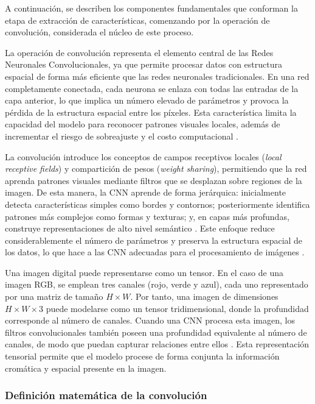 	A continuación, se describen los componentes fundamentales que conforman la etapa de extracción de características, comenzando por la operación de convolución, considerada el núcleo de este proceso.
	
	La operación de convolución representa el elemento central de las Redes Neuronales Convolucionales, ya que permite procesar datos con estructura espacial de forma más eficiente que las redes neuronales tradicionales. En una red completamente conectada, cada neurona se enlaza con todas las entradas de la capa anterior, lo que implica un número elevado de parámetros y provoca la pérdida de la estructura espacial entre los píxeles. Esta característica limita la capacidad del modelo para reconocer patrones visuales locales, además de incrementar el riesgo de sobreajuste y el costo computacional \cite{goodfellow2016dl}.
	
	La convolución introduce los conceptos de campos receptivos locales (\textit{local receptive fields}) y compartición de pesos (\textit{weight sharing}), permitiendo que la red aprenda patrones visuales mediante filtros que se desplazan sobre regiones de la imagen. De esta manera, la CNN aprende de forma jerárquica: inicialmente detecta características simples como bordes y contornos; posteriormente identifica patrones más complejos como formas y texturas; y, en capas más profundas, construye representaciones de alto nivel semántico \cite{oshea2015}. Este enfoque reduce considerablemente el número de parámetros y preserva la estructura espacial de los datos, lo que hace a las CNN adecuadas para el procesamiento de imágenes \cite{lecun2015deep, dai2021cnn}.
	
	Una imagen digital puede representarse como un tensor. En el caso de una imagen RGB, se emplean tres canales (rojo, verde y azul), cada uno representado por una matriz de tamaño $H \times W$. Por tanto, una imagen de dimensiones $H \times W \times 3$ puede modelarse como un tensor tridimensional, donde la profundidad corresponde al número de canales. Cuando una CNN procesa esta imagen, los filtros convolucionales también poseen una profundidad equivalente al número de canales, de modo que puedan capturar relaciones entre ellos \cite{oshea2015, albawi2017}. Esta representación tensorial permite que el modelo procese de forma conjunta la información cromática y espacial presente en la imagen.
	
	\subsubsection*{Definición matemática de la convolución}
	
